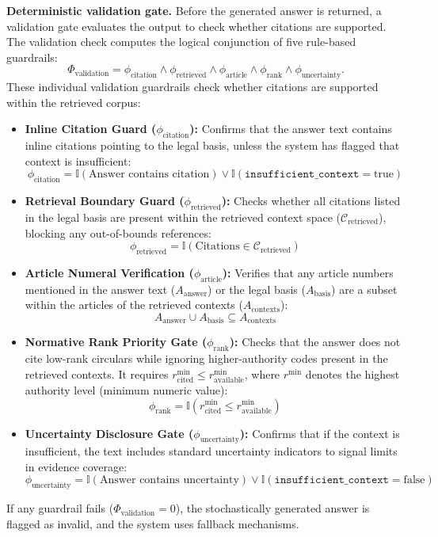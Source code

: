 \textbf{Deterministic validation gate.} Before the generated answer is returned, a validation gate evaluates the output to check whether citations are supported. The validation check computes the logical conjunction of five rule-based guardrails:
\[
\Phi_{\mathrm{validation}} = \phi_{\mathrm{citation}} \land \phi_{\mathrm{retrieved}} \land \phi_{\mathrm{article}} \land \phi_{\mathrm{rank}} \land \phi_{\mathrm{uncertainty}}.
\]
These individual validation guardrails check whether citations are supported within the retrieved corpus:
\begin{itemize}
    \item \textbf{Inline Citation Guard ($\phi_{\mathrm{citation}}$):} Confirms that the answer text contains inline citations pointing to the legal basis, unless the system has flagged that context is insufficient:
    \[
    \phi_{\mathrm{citation}} = \mathbb{I}\left( \text{Answer contains citation} \right) \lor \mathbb{I}\left( \texttt{insufficient\_}\allowbreak\texttt{context} = \text{true} \right)
    \]
    \item \textbf{Retrieval Boundary Guard ($\phi_{\mathrm{retrieved}}$):} Checks whether all citations listed in the legal basis are present within the retrieved context space ($\mathcal{C}_{\mathrm{retrieved}}$), blocking any out-of-bounds references:
    \[
    \phi_{\mathrm{retrieved}} = \mathbb{I}\left( \text{Citations} \in \mathcal{C}_{\mathrm{retrieved}} \right)
    \]
    \item \textbf{Article Numeral Verification ($\phi_{\mathrm{article}}$):} Verifies that any article numbers mentioned in the answer text ($A_{\mathrm{answer}}$) or the legal basis ($A_{\mathrm{basis}}$) are a subset within the articles of the retrieved contexts ($A_{\mathrm{contexts}}$):
    \[
    A_{\mathrm{answer}} \cup A_{\mathrm{basis}} \subseteq A_{\mathrm{contexts}}
    \]
    \item \textbf{Normative Rank Priority Gate ($\phi_{\mathrm{rank}}$):} Checks that the answer does not cite low-rank circulars while ignoring higher-authority codes present in the retrieved contexts. It requires $r_{\mathrm{cited}}^{\min} \le r_{\mathrm{available}}^{\min}$, where $r^{\min}$ denotes the highest authority level (minimum numeric value):
    \[
    \phi_{\mathrm{rank}} = \mathbb{I}\left( r_{\mathrm{cited}}^{\min} \le r_{\mathrm{available}}^{\min} \right)
    \]
    \item \textbf{Uncertainty Disclosure Gate ($\phi_{\mathrm{uncertainty}}$):} Confirms that if the context is insufficient, the text includes standard uncertainty indicators to signal limits in evidence coverage:
    \[
    \phi_{\mathrm{uncertainty}} = \mathbb{I}\left( \text{Answer contains uncertainty} \right) \lor \mathbb{I}\left( \texttt{insufficient\_}\allowbreak\texttt{context} = \text{false} \right)
    \]
\end{itemize}
If any guardrail fails ($\Phi_{\mathrm{validation}} = 0$), the stochastically generated answer is flagged as invalid, and the system uses fallback mechanisms.

